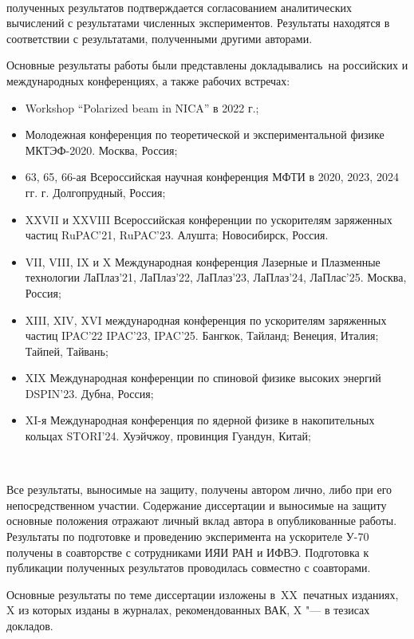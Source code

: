 ~\\
\par {\reliability} полученных результатов подтверждается согласованием аналитических вычислений с результатами численных экспериментов. Результаты находятся в соответствии с результатами, полученными другими авторами.
~\\
\par {\probation}
Основные результаты работы были представлены докладывались~на российских и международных конференциях, а также рабочих встречах: 
\begin{itemize}
\item Workshop “Polarized beam in NICA” в 2022 г.;
\item Молодежная конференция по теоретической и экспериментальной физике МКТЭФ-2020. Москва, Россия;
\item 63, 65, 66-ая Всероссийская научная конференция МФТИ в 2020, 2023, 2024 гг. г. Долгопрудный,
Россия;
\item XXVII и XXVIII Всероссийская конференции по ускорителям заряженных частиц RuPAC'21, RuPAC'23. Алушта; Новосибирск, Россия.
\item VII, VIII, IX и X Международная конференция Лазерные и Плазменные технологии ЛаПлаз'21, ЛаПлаз'22, ЛаПлаз'23, ЛаПлаз'24, ЛаПлас'25. Москва, Россия;
\item XIII, XIV, XVI международная конференция по ускорителям заряженных частиц IPAC'22 IPAC'23, IPAC'25. Бангкок, Тайланд; Венеция, Италия; Тайпей, Тайвань;
\item XIX Международная конференции по спиновой физике высоких энергий DSPIN'23. Дубна, Россия;
\item XI-я Международная конференция по ядерной физике в накопительных кольцах STORI’24. Хуэйчжоу, провинция Гуандун, Китай;
\end{itemize}
~\\
\par {\contribution} Все результаты, выносимые на защиту, получены автором лично, либо при его непосредственном участии. Содержание диссертации и выносимые на защиту основные положения отражают личный вклад автора в опубликованные работы. Результаты по подготовке и проведению эксперимента на ускорителе У-70 получены в соавторстве с сотрудниками ИЯИ РАН и ИФВЭ. Подготовка к публикации полученных результатов проводилась совместно с соавторами.
~\\
\par {}
{%
 {\publications} Основные результаты по теме диссертации изложены
    в~XX~печатных изданиях,
    X из которых изданы в журналах, рекомендованных ВАК,
    X "--- в тезисах докладов.
}%
